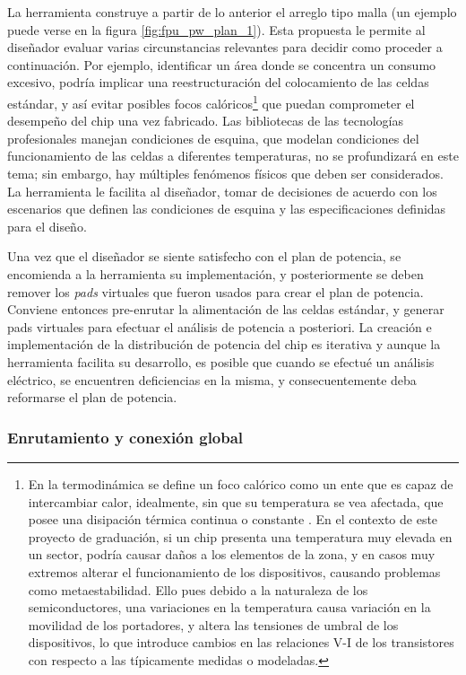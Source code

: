 La herramienta construye a partir de lo anterior el arreglo tipo malla (un ejemplo puede verse en la figura \ref{fig:fpu_pw_plan_1}). Esta propuesta le permite al diseñador evaluar varias circunstancias relevantes para decidir como proceder a continuación. Por ejemplo, identificar un área donde se concentra un consumo excesivo, podría implicar una reestructuración del colocamiento de las celdas estándar, y así evitar posibles {focos calóricos}\footnote{En la termodinámica se define un foco calórico como un ente que es capaz de intercambiar calor, idealmente, sin que su temperatura se vea afectada, que posee una disipación térmica continua o constante  \cite{villalobos30entropia}. En el contexto de este proyecto de graduación, si un chip presenta una temperatura muy elevada en un sector, podría causar daños a los elementos de la zona, y en casos muy extremos alterar el funcionamiento de los dispositivos, causando problemas como metaestabilidad. Ello pues debido a la naturaleza de los semiconductores, una variaciones en la temperatura causa variación en la movilidad de los portadores, y altera las tensiones de umbral de los dispositivos, lo que introduce cambios en las relaciones V-I de los transistores con respecto a las típicamente medidas o modeladas.} que puedan comprometer el desempeño del chip una vez fabricado. Las bibliotecas de las tecnologías profesionales manejan condiciones de esquina, que modelan condiciones del funcionamiento de las celdas a diferentes temperaturas, no se profundizará en este tema; sin embargo, hay múltiples fenómenos físicos que deben ser considerados. La herramienta le facilita al diseñador, tomar de decisiones de acuerdo con los escenarios que definen las condiciones de esquina y las especificaciones definidas para el diseño.

Una vez que el diseñador se siente satisfecho con el plan de potencia, se encomienda a la herramienta su implementación, y posteriormente se deben remover los \textit{pads} virtuales que fueron usados para crear el plan de potencia. Conviene entonces pre-enrutar la alimentación de las celdas estándar, y generar pads virtuales para efectuar el análisis de potencia a posteriori. La creación e implementación de la distribución de potencia del chip es iterativa y aunque la herramienta facilita su desarrollo, es posible que cuando se efectué un análisis eléctrico, se encuentren deficiencias en la misma, y consecuentemente deba reformarse el plan de potencia.

\subsubsection{Enrutamiento y conexión global}

